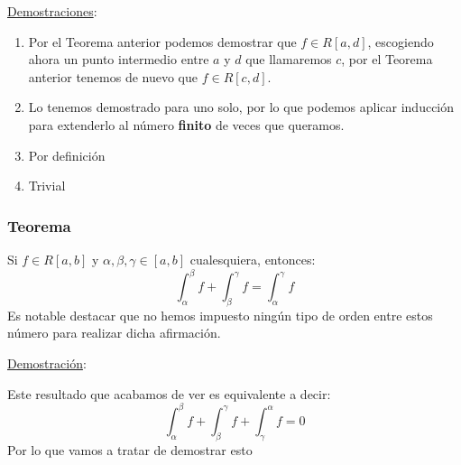 \documentclass[10pt,a4paper,openright]{book}
\begin{document}
\underline{Demostraciones}:
\begin{enumerate}
\item Por el Teorema anterior podemos demostrar que $f\in R[a,d]$, escogiendo ahora un punto intermedio entre $a$ y $d$ que llamaremos $c$, por el Teorema anterior tenemos de nuevo que $f\in R[c,d]$.

\item Lo tenemos demostrado para uno solo, por lo que podemos aplicar inducción para extenderlo al número \textbf{finito} de veces que queramos.

\item Por definición

\item Trivial
\end{enumerate}

\subsubsection*{Teorema}
Si $f\in R[a,b]$ y $\alpha,\beta,\gamma\in [a,b]$ cualesquiera, entonces:
$$\int_{\alpha}^{\beta} f+ \int_{\beta}^{\gamma} f = \int_{\alpha}^{\gamma} f$$
Es notable destacar que no hemos impuesto ningún tipo de orden entre estos número para realizar dicha afirmación.

\underline{Demostración}:

Este resultado que acabamos de ver es equivalente a decir:
$$\int_{\alpha}^{\beta} f+ \int_{\beta}^{\gamma} f + \int_{\gamma}^{\alpha} f = 0$$
Por lo que vamos a tratar de demostrar esto
\end{document}
